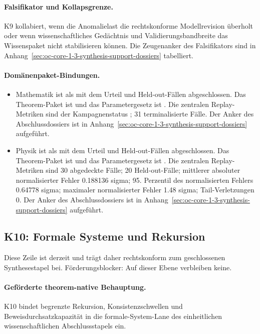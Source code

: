 \paragraph{Falsifikator und Kollapsgrenze.}
K9 kollabiert, wenn die Anomalielast die rechtskonforme Modellrevision überholt oder wenn wissenschaftliches Gedächtnis und Validierungsbandbreite das Wissenspaket nicht stabilisieren können.
Die Zeugenanker des Falsifikators sind in Anhang~\ref{sec:oc-core-1-3-synthesis-support-dossiers} tabelliert.

\paragraph{Domänenpaket-Bindungen.}
\begin{itemize}[leftmargin=1.6em,nosep]
\item Mathematik ist als  mit dem Urteil  und  Held-out-Fällen abgeschlossen. Das Theorem-Paket ist  und das Parametergesetz ist . Die zentralen Replay-Metriken sind der Kampagnenstatus ; 31 terminalisierte Fälle. Der Anker des Abschlussdossiers ist in Anhang~\ref{sec:oc-core-1-3-synthesis-support-dossiers} aufgeführt.
\item Physik ist als  mit dem Urteil  und  Held-out-Fällen abgeschlossen. Das Theorem-Paket ist  und das Parametergesetz ist . Die zentralen Replay-Metriken sind 30 abgedeckte Fälle; 20 Held-out-Fälle; mittlerer absoluter normalisierter Fehler 0.188136 sigma; 95. Perzentil des normalisierten Fehlers 0.64778 sigma; maximaler normalisierter Fehler 1.48 sigma; Tail-Verletzungen 0. Der Anker des Abschlussdossiers ist in Anhang~\ref{sec:oc-core-1-3-synthesis-support-dossiers} aufgeführt.
\end{itemize}

\subsection{K10: Formale Systeme und Rekursion}
\label{sec:oc-core-1-3-synthesis-k10}
Diese Zeile ist derzeit  und trägt daher rechtskonform zum geschlossenen Synthesestapel bei.
Förderungsblocker: Auf dieser Ebene verbleiben keine.

\paragraph{Geförderte theorem-native Behauptung.}
K10 bindet begrenzte Rekursion, Konsistenzschwellen und Beweisdurchsatzkapazität in die formale-System-Lane des einheitlichen wissenschaftlichen Abschlussstapels ein.

